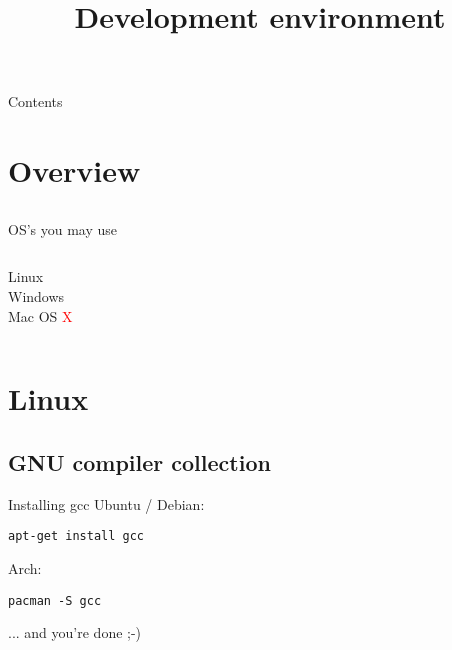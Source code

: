 
\newcommand{\topic}{
	Development environment
}


\title{\topic}
\supertitle{\course}
\date{}



\maketitle

\begin{frame}{Contents}
	\tableofcontents
\end{frame}

\section{Overview}
\subsection{}
\begin{frame}{OS's you may use}
	\begin{columns}[T]
		Linux\\
		\uncover<2->{\textcolor{green}{recommended}}
		Windows\\
		\uncover<3->{\textcolor{orange}{supported}}
		Mac OS \textcolor<4->{red}{X}
	\end{columns}
\end{frame}
\section{Linux}
\subsection{GNU compiler collection}
\begin{frame}[fragile]{Installing gcc}
	Ubuntu / Debian: 
	\begin{lstlisting}[numbers=none]
apt-get install gcc
\end{lstlisting}
	Arch:
	\begin{lstlisting}[numbers=none]
pacman -S gcc
\end{lstlisting}
	... and you're done ;-)
\end{frame}
